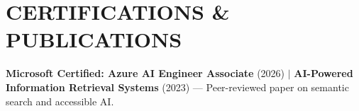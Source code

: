 \documentclass[letterpaper,10pt]{article}
\newcommand{\myuline}[1]{%
  \uline{\phantom{#1}}%
  \llap{\contour{white}{#1}}%
}
\begin{document}
\section{CERTIFICATIONS \& PUBLICATIONS}
 \begin{itemize}[leftmargin=0in, label={}]
    \small{
        \item[] \textbf{Microsoft Certified: Azure AI Engineer Associate} (2026) \hspace{4pt} $|$ \hspace{4pt} \textbf{AI-Powered Information Retrieval Systems} (2023) — Peer-reviewed paper on semantic search and accessible AI. \href{https://rjpn.org/ijcspub/viewpaperforall.php?paper=IJCSP23B1477}{\myuline{[Link]}}
    }
 \end{itemize}

\end{document}
